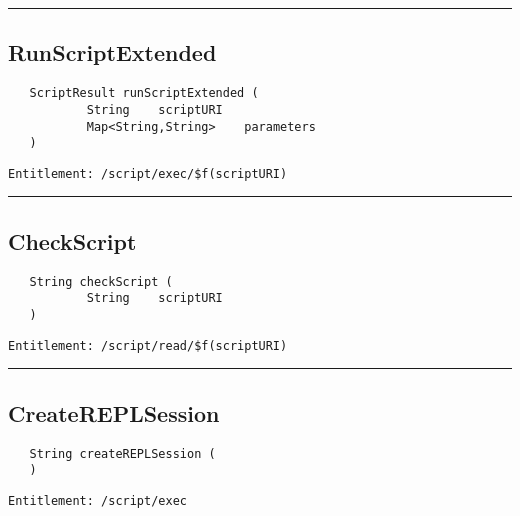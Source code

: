 \rule{12cm}{2pt}
\subsection{RunScriptExtended}
\label{Api:RunScriptExtended}
\begin{verbatim}
   ScriptResult runScriptExtended (
           String    scriptURI
           Map<String,String>    parameters
   )
\end{verbatim}
\begin{Verbatim}[fontsize=\small, formatcom=\color{Maroon}]
  Entitlement: /script/exec/$f(scriptURI)
\end{Verbatim}



\rule{12cm}{2pt}
\subsection{CheckScript}
\label{Api:CheckScript}
\begin{verbatim}
   String checkScript (
           String    scriptURI
   )
\end{verbatim}
\begin{Verbatim}[fontsize=\small, formatcom=\color{Maroon}]
  Entitlement: /script/read/$f(scriptURI)
\end{Verbatim}



\rule{12cm}{2pt}
\subsection{CreateREPLSession}
\label{Api:CreateREPLSession}
\begin{verbatim}
   String createREPLSession (
   )
\end{verbatim}
\begin{Verbatim}[fontsize=\small, formatcom=\color{Maroon}]
  Entitlement: /script/exec
\end{Verbatim}



